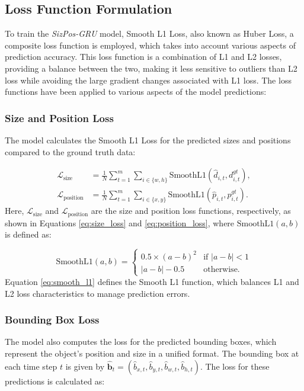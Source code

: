 \documentclass[12pt,oneside]{book} %
\begin{document}
\newpage
\subsection{Loss Function Formulation}
To train the \textit{SizPos-GRU} model, Smooth L1 Loss, also known as Huber
Loss, a composite loss function is employed, which takes into account various
aspects of prediction accuracy. This loss function is a combination of L1 and
L2 losses, providing a balance between the two, making it less sensitive to
outliers than L2 loss while avoiding the large gradient changes associated with
L1 loss. The loss functions have been applied to various aspects of the model
predictions:

\subsubsection*{Size and Position Loss}
\noindent The model calculates the Smooth L1 Loss for the predicted sizes and positions compared to the ground truth data:

\begin{align}
    \mathcal{L}_{\text{size}}     & = \frac{1}{N} \sum_{t=1}^{m} \sum_{i \in \{w, h\}} \text{SmoothL1}\left(\hat{d}_{i,t}, d^{gt}_{i,t}\right),  \label{eq:size_loss}      \\
    \mathcal{L}_{\text{position}} & = \frac{1}{N} \sum_{t=1}^{m} \sum_{i \in \{x, y\}} \text{SmoothL1}\left(\hat{p}_{i,t}, p^{gt}_{i,t}\right).   \label{eq:position_loss}
\end{align}
Here, \(\mathcal{L}_{\text{size}}\) and \(\mathcal{L}_{\text{position}}\) are
the size and position loss functions, respectively, as shown in Equations
\eqref{eq:size_loss} and \eqref{eq:position_loss}, where \(\text{SmoothL1}(a,
b)\) is defined as:

\begin{equation}
    \text{SmoothL1}(a, b) =
    \begin{cases} 
        0.5 \times (a - b)^2 & \text{if } |a - b| < 1 \\ 
        |a - b| - 0.5        & \text{otherwise}.
    \end{cases} \label{eq:smooth_l1}
\end{equation}
Equation \eqref{eq:smooth_l1} defines the Smooth L1 function, which balances L1
and L2 loss characteristics to manage prediction errors.

\subsubsection*{Bounding Box Loss}
\noindent The model also computes the loss for the predicted bounding boxes, which represent the object's position and size in a unified format. The bounding box at each time step \(t\) is given by \(\hat{\mathbf{b}}_t = (\hat{b}_{x,t}, \hat{b}_{y,t}, \hat{b}_{w,t}, \hat{b}_{h,t})\). The loss for these predictions is calculated as:
\end{document}
